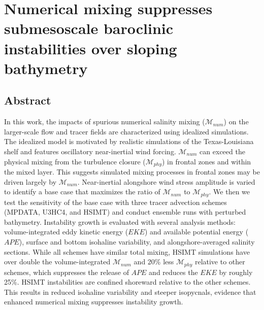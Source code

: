 

\chapter[footnote={This manuscript is \textit{under review} for the \textit{Journal of Advances in Modeling Earth System}.  Full citation:  Schlichting, D., Hetland, R. D., \& Jones, C. S. (2024). Numerical mixing suppresses submesoscale baroclinic instabilities over sloping bathymetry. Authorea Preprints. \url{ https://essopenarchive.org/doi/full/10.22541/essoar.170983234.49281676}}]{Numerical mixing suppresses submesoscale baroclinic instabilities over sloping bathymetry}

\section{Abstract}
In this work, the impacts of spurious numerical salinity mixing ($\mathcal{M}_{num}$) on the larger-scale flow and tracer fields are characterized using idealized simulations. The idealized model is motivated by realistic simulations of the Texas-Louisiana shelf and features oscillatory near-inertial wind forcing. $\mathcal{M}_{num}$ can exceed the physical mixing from the turbulence closure ($\mathcal{M}_{phy}$) in frontal zones and within the mixed layer. This suggests simulated mixing processes in frontal zones may be driven largely by $\mathcal{M}_{num}$. Near-inertial alongshore wind stress amplitude is varied to identify a base case that maximizes the ratio of $\mathcal{M}_{num}$ to $\mathcal{M}_{phy}$. We then we test the sensitivity of the base case with three tracer advection schemes (MPDATA, U3HC4, and HSIMT) and conduct ensemble runs with perturbed bathymetry. Instability growth is evaluated with several analysis methods: volume-integrated eddy kinetic energy ($EKE$) and available potential energy ($APE$), surface and bottom isohaline variability, and alongshore-averaged salinity sections. While all schemes have similar total mixing, HSIMT simulations have over double the volume-integrated $\mathcal{M}_{num}$ and 20\% less $\mathcal{M}_{phy}$ relative to other schemes, which suppresses the release of $APE$ and reduces the $EKE$ by roughly 25\%. HSIMT instabilities are confined shoreward relative to the other schemes. This results in reduced isohaline variability and steeper isopycnals, evidence that enhanced numerical mixing suppresses instability growth.

